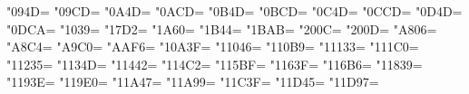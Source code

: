 \newXeTeXintercharclass\KclassVir
\newXeTeXintercharclass\KclassCM
\newXeTeXintercharclass\KclassNum

\XeTeXcharclass"094D=\KclassVir
\XeTeXcharclass"09CD=\KclassVir
\XeTeXcharclass"0A4D=\KclassVir
\XeTeXcharclass"0ACD=\KclassVir
\XeTeXcharclass"0B4D=\KclassVir
\XeTeXcharclass"0BCD=\KclassVir
\XeTeXcharclass"0C4D=\KclassVir
\XeTeXcharclass"0CCD=\KclassVir
\XeTeXcharclass"0D4D=\KclassVir
\XeTeXcharclass"0DCA=\KclassVir
\XeTeXcharclass"1039=\KclassVir
\XeTeXcharclass"17D2=\KclassVir
\XeTeXcharclass"1A60=\KclassVir
\XeTeXcharclass"1B44=\KclassVir
\XeTeXcharclass"1BAB=\KclassVir
\XeTeXcharclass"200C=\KclassVir
\XeTeXcharclass"200D=\KclassVir
\XeTeXcharclass"A806=\KclassVir
\XeTeXcharclass"A8C4=\KclassVir
\XeTeXcharclass"A9C0=\KclassVir
\XeTeXcharclass"AAF6=\KclassVir
\XeTeXcharclass"10A3F=\KclassVir
\XeTeXcharclass"11046=\KclassVir
\XeTeXcharclass"110B9=\KclassVir
\XeTeXcharclass"11133=\KclassVir
\XeTeXcharclass"111C0=\KclassVir
\XeTeXcharclass"11235=\KclassVir
\XeTeXcharclass"1134D=\KclassVir
\XeTeXcharclass"11442=\KclassVir
\XeTeXcharclass"114C2=\KclassVir
\XeTeXcharclass"115BF=\KclassVir
\XeTeXcharclass"1163F=\KclassVir
\XeTeXcharclass"116B6=\KclassVir
\XeTeXcharclass"11839=\KclassVir
\XeTeXcharclass"1193E=\KclassVir
\XeTeXcharclass"119E0=\KclassVir
\XeTeXcharclass"11A47=\KclassVir
\XeTeXcharclass"11A99=\KclassVir
\XeTeXcharclass"11C3F=\KclassVir
\XeTeXcharclass"11D45=\KclassVir
\XeTeXcharclass"11D97=\KclassVir

